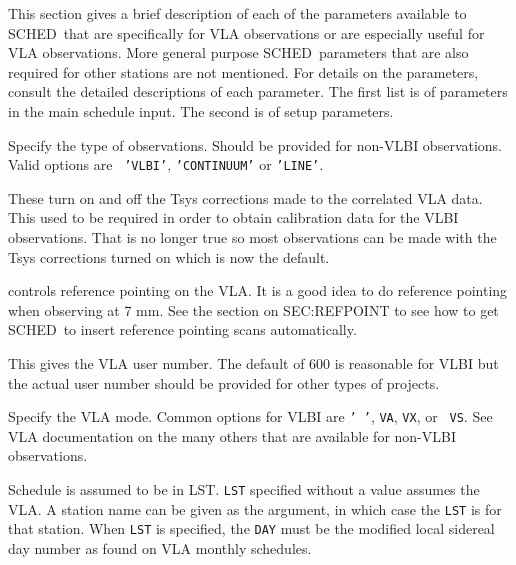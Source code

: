 \documentclass{report}
\newcommand{\schedb}{{\sc SCHED~}}
\begin{document}
This section gives a brief description of each of the parameters
available to \schedb that are specifically for VLA observations or
are especially useful for VLA observations.  More general purpose
\schedb parameters that are also required for other stations are
not mentioned.  For details on the parameters, consult
the detailed descriptions of each parameter.  The first list
is of parameters in the main schedule input.  The second is of
setup parameters.

\begin{list}{}{\parsep 0em  \itemsep 0em }

\item {} Specify the type of observations.
Should be provided for non-VLBI observations. Valid options are {\tt
'VLBI'}, {\tt 'CONTINUUM'} or {\tt 'LINE'}.

\item {} These turn on
and off the Tsys corrections made to the correlated VLA data. This
used to be required in order to obtain calibration data for the VLBI
observations. That is no longer true so most observations can be made
with the Tsys corrections turned on which is now the default.

\item {} controls reference pointing
on the VLA.  It is a good idea to do reference pointing when
observing at 7 mm.  See the section on 
{SEC:REFPOINT} to see how to get \schedb to insert reference pointing
scans automatically.

\item {} This gives the VLA user
number. The default of 600 is reasonable for VLBI but the actual user
number should be provided for other types of projects.

\item {} Specify the VLA mode.
Common options for VLBI are {\tt ' '}, {\tt VA}, {\tt VX}, or {\tt
VS}. See VLA documentation on the many others that are available
for non-VLBI observations.

\item {} Schedule is assumed to be in LST. {\tt LST}
specified without a value assumes the VLA. A station name can be given
as the argument, in which case the {\tt LST} is for that station. When
{\tt LST} is specified, the {\tt DAY} must be the modified local
sidereal day number as found on VLA monthly schedules.


\end{list}
\end{document}
